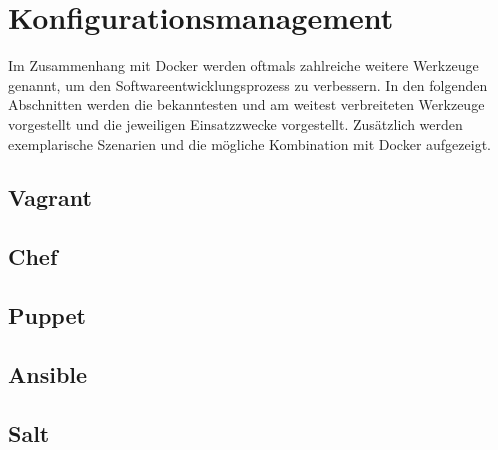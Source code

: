 \chapter{Konfigurationsmanagement}
Im Zusammenhang mit Docker werden oftmals zahlreiche weitere Werkzeuge genannt, um den Softwareentwicklungsprozess zu verbessern. In den folgenden Abschnitten werden die bekanntesten und am weitest verbreiteten Werkzeuge vorgestellt und die jeweiligen Einsatzzwecke vorgestellt. Zusätzlich werden exemplarische Szenarien und die mögliche Kombination mit Docker aufgezeigt. 

\section{Vagrant}
\section{Chef}
\section{Puppet}
\section{Ansible}
\section{Salt}
